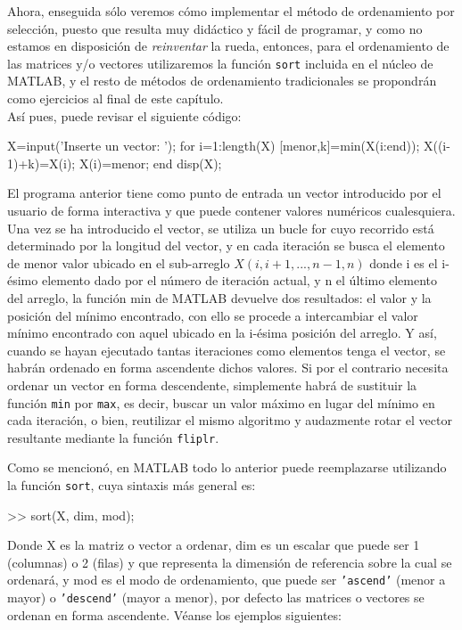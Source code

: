 Ahora, enseguida sólo veremos cómo implementar el método de ordenamiento
por selección, puesto que resulta muy didáctico y fácil de programar, y
como no estamos en disposición de \emph{reinventar} la rueda, entonces,
para el ordenamiento de las matrices y/o vectores utilizaremos la
función \texttt{sort} incluida en el núcleo de MATLAB, y el resto de
métodos de ordenamiento tradicionales se propondrán como ejercicios al
final de este capítulo. \\

Así pues, puede revisar el siguiente código:

\begin{matlab}
X=input('Inserte un vector: ');
for i=1:length(X)
    [menor,k]=min(X(i:end));
    X((i-1)+k)=X(i);
    X(i)=menor;
end
disp(X); %
\end{matlab}

El programa anterior tiene como punto de entrada un vector introducido
por el usuario de forma interactiva y que puede contener valores
numéricos cualesquiera. Una vez se ha introducido el vector, se utiliza
un bucle for cuyo recorrido está determinado por la longitud del vector,
y en cada iteración se busca el elemento de menor valor ubicado en el
sub-arreglo $X(i,i+1,...,n-1,n)$ donde i es el i-ésimo elemento
dado por el número de iteración actual, y n el último elemento del
arreglo, la función min de MATLAB devuelve dos resultados: el valor y la
posición del mínimo encontrado, con ello se procede a intercambiar el
valor mínimo encontrado con aquel ubicado en la i-ésima posición del
arreglo. Y así, cuando se hayan ejecutado tantas iteraciones como
elementos tenga el vector, se habrán ordenado en forma ascendente dichos
valores. Si por el contrario necesita ordenar un vector en forma
descendente, simplemente habrá de sustituir la función \texttt{min} por
\texttt{max}, es decir, buscar un valor máximo en lugar del mínimo en
cada iteración, o bien, reutilizar el mismo algoritmo y audazmente rotar
el vector resultante mediante la función \texttt{fliplr}.

Como se mencionó, en MATLAB todo lo anterior puede reemplazarse
utilizando la función \texttt{sort}, cuya sintaxis más general es:

\begin{matlab}
>> sort(X, dim, mod);
\end{matlab}

Donde X es la matriz o vector a ordenar, dim es un escalar que puede ser
1 (columnas) o 2 (filas) y que representa la dimensión de referencia
sobre la cual se ordenará, y mod es el modo de ordenamiento, que puede
ser \texttt{'ascend'} (menor a mayor) o \texttt{'descend'} (mayor a
menor), por defecto las matrices o vectores se ordenan en forma
ascendente. Véanse los ejemplos siguientes:

